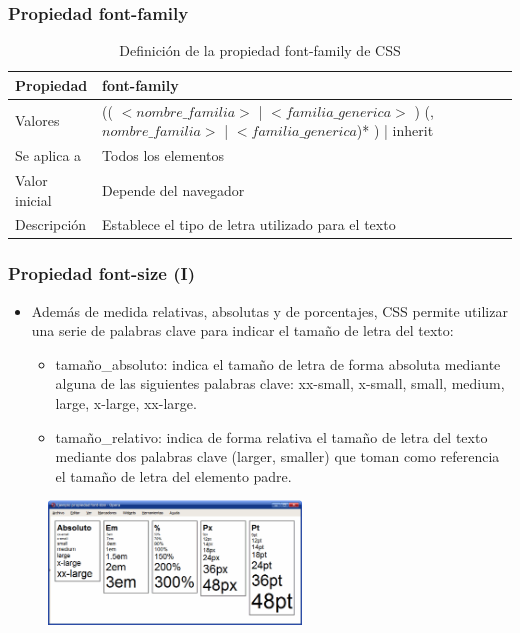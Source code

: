 
\begin{frame}
\frametitle{Propiedad font-family}

\begin{center}
  \begin{table}
   \begin{tabular}{p{1.8cm}p{7.8cm}}
Propiedad & \bf{font-family} \\ \hline
Valores& (( $<nombre\_familia>$ | $<familia\_generica>$ ) (,$nombre\_familia>$ | $<familia\_generica$)* ) | inherit \\ \hline
Se aplica a& Todos los elementos \\ \hline
Valor inicial& Depende del navegador \\ \hline
Descripción& Establece el tipo de letra utilizado para el texto \\ \hline
  \end{tabular}
   \caption{Definición de la propiedad font-family de CSS}
 \end{table}
\end{center}


\end{frame}



\begin{frame}
\frametitle{Propiedad font-size (I)}

\begin{itemize}
  \item Además de medida relativas, absolutas y de porcentajes, CSS permite utilizar una serie de palabras clave para indicar el tamaño de letra del texto:
  \begin{itemize}
    \item tamaño\_absoluto: indica el tamaño de letra de forma absoluta mediante alguna de las siguientes palabras clave: xx-small, x-small, small, medium, large, x-large, xx-large.
    \item tamaño\_relativo: indica de forma relativa el tamaño de letra del texto mediante dos palabras clave (larger, smaller) que toman como referencia el tamaño de letra del elemento padre.
  \end{itemize}
\end{itemize}


\begin{center}
\begin{figure}[p]
\includegraphics[width=0.6\textwidth]{figs/f0601.png}
\end{figure}
\end{center}

\end{frame}


